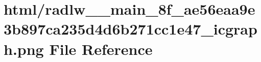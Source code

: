 \hypertarget{radlw____main__8f__ae56eaa9e3b897ca235d4d6b271cc1e47__icgraph_8png}{}\section{html/radlw\+\_\+\+\_\+main\+\_\+8f\+\_\+ae56eaa9e3b897ca235d4d6b271cc1e47\+\_\+icgraph.png File Reference}
\label{radlw____main__8f__ae56eaa9e3b897ca235d4d6b271cc1e47__icgraph_8png}
